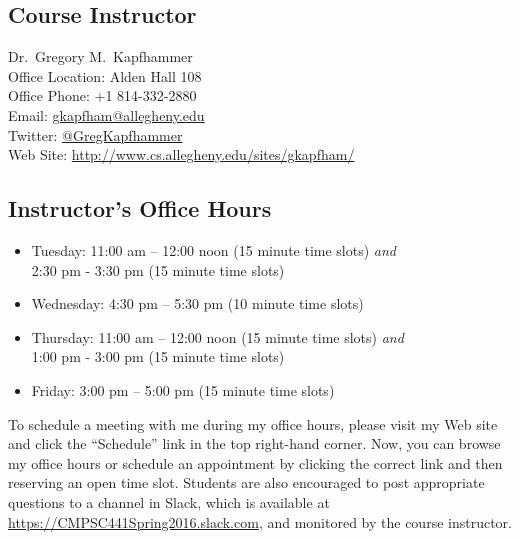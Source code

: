 


\usepackage[compact]{titlesec}



\subsection*{Course Instructor}
Dr.\ Gregory M.\ Kapfhammer\\
\noindent Office Location: Alden Hall 108 \\
\noindent Office Phone: +1 814-332-2880 \\
\noindent Email: \url{gkapfham@allegheny.edu} \\
\noindent Twitter: \url{@GregKapfhammer} \\
\noindent Web Site: \url{http://www.cs.allegheny.edu/sites/gkapfham/}

\subsection*{Instructor's Office Hours}

\begin{itemize}
  \itemsep 0em

  \item Tuesday: 11:00 am -- 12:00 noon (15 minute time slots) {\em and} \\ \hspace*{.6in}
    2:30 pm - 3:30 pm (15 minute time slots)

  \item Wednesday: 4:30 pm -- 5:30 pm (10 minute time slots)

  \item Thursday: 11:00 am -- 12:00 noon (15 minute time slots) {\em and} \\ \hspace*{.68in}
    1:00 pm - 3:00 pm (15 minute time slots)

  \item Friday: 3:00 pm -- 5:00 pm (15 minute time slots)

\end{itemize}

\noindent To schedule a meeting with me during my office hours, please visit my Web site and click the ``Schedule'' link
in the top right-hand corner. Now, you can browse my office hours or schedule an appointment by clicking the correct
link and then reserving an open time slot. Students are also encouraged to post appropriate questions to a channel in
Slack, which is available at \url{https://CMPSC441Spring2016.slack.com}, and monitored by the course instructor.

